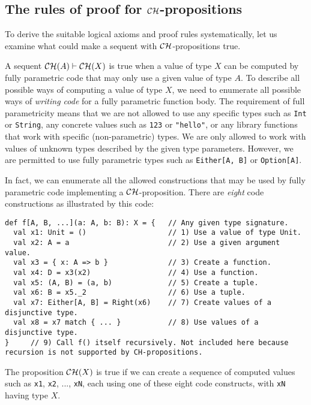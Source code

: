 \subsection{The rules of proof for ${\cal CH}$-propositions\label{subsec:The-rules-of-proof}}

To derive the suitable logical axioms and proof rules systematically,
let us examine what could make a sequent with ${\cal CH}$-propositions
true.

A sequent ${\cal CH}(A)\vdash{\cal CH}(X)$ is true when a value of
type $X$ can be computed by fully parametric code that may only use
a given value of type $A$. To describe all possible ways of computing
a value of type $X$, we need to enumerate all possible ways of \emph{writing
code} for a fully parametric function body. The requirement of full
parametricity means that we are not allowed to use any specific types
such as \lstinline!Int! or \lstinline!String!, any concrete values
such as \lstinline!123! or \lstinline!"hello"!, or any library functions
that work with specific (non-parametric) types. We are only allowed
to work with values of unknown types described by the given type parameters.
However, we are permitted to use fully parametric types such as \lstinline!Either[A, B]!
or \lstinline!Option[A]!. 

In fact, we can enumerate all the allowed constructions that may be
used by fully parametric code implementing a ${\cal CH}$-proposition.
There are \emph{eight} code constructions
as illustrated by this code:
\begin{lstlisting}
def f[A, B, ...](a: A, b: B): X = {   // Any given type signature.
  val x1: Unit = ()                   // 1) Use a value of type Unit.
  val x2: A = a                       // 2) Use a given argument value.
  val x3 = { x: A => b }              // 3) Create a function.
  val x4: D = x3(x2)                  // 4) Use a function.
  val x5: (A, B) = (a, b)             // 5) Create a tuple.
  val x6: B = x5._2                   // 6) Use a tuple.
  val x7: Either[A, B] = Right(x6)    // 7) Create values of a disjunctive type.
  val x8 = x7 match { ... }           // 8) Use values of a disjunctive type.
}     // 9) Call f() itself recursively. Not included here because recursion is not supported by CH-propositions.
\end{lstlisting}
The proposition ${\cal CH}(X)$ is true if we can create a sequence
of computed values such as \lstinline!x1!, \lstinline!x2!, ...,
\lstinline!xN!, each using one of these eight code constructs, with
\lstinline!xN! having type $X$. 

